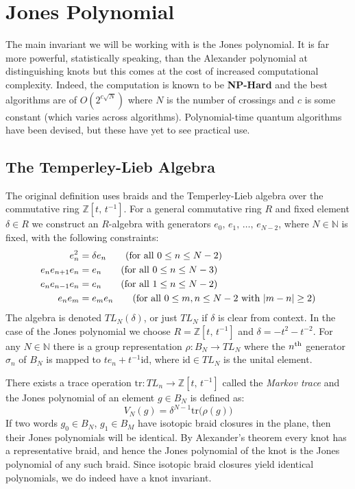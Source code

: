 \section{Jones Polynomial}
    The main invariant we will be working with is the Jones polynomial. It is
    far more powerful, statistically speaking, than the Alexander polynomial
    at distinguishing knots but this comes at the cost of increased
    computational complexity. Indeed, the computation is known to be
    \textbf{NP-Hard} and the best algorithms are of $O(2^{c\sqrt{N}})$ where
    $N$ is the number of crossings and $c$ is some constant (which varies
    across algorithms). Polynomial-time quantum algorithms have been devised,
    but these have yet to see practical use.
    \subsection{The Temperley-Lieb Algebra}
        The original definition uses braids and the Temperley-Lieb algebra
        over the commutative ring $\mathbb{Z}[t,\,t^{-1}]$. For a general
        commutative ring $R$ and fixed element $\delta\in{R}$ we construct
        an $R$-algebra with generators $e_{0},\,e_{1},\,\dots,\,e_{N-2}$,
        where $N\in\mathbb{N}$ is fixed, with the following constraints:
        \begin{align}
            e_{n}^{2}&=\delta{e}_{n}
            \tag{for all $0\leq{n}\leq{N-2}$}\\
            e_{n}e_{n+1}e_{n}&=e_{n}
            \tag{for all $0\leq{n}\leq{N-3}$}\\
            e_{n}e_{n-1}e_{n}&=e_{n}
            \tag{for all $1\leq{n}\leq{N-2}$}\\
            e_{n}e_{m}&=e_{m}e_{n}
            \tag{for all $0\leq{m,n}\leq{N-2}$ with $|m-n|\geq{2}$}
        \end{align}
        The algebra is denoted $TL_{N}(\delta)$, or just $TL_{N}$ if $\delta$
        is clear from context. In the case of the Jones polynomial we choose
        $R=\mathbb{Z}[t,\,t^{-1}]$ and $\delta=-t^{2}-t^{-2}$. For any
        $N\in\mathbb{N}$ there is a group representation
        $\rho:B_{N}\rightarrow{TL}_{N}$ where the $n^{\small\textrm{th}}$
        generator $\sigma_{n}$ of $B_{N}$ is mapped to
        $te_{n}+t^{-1}\textrm{id}$, where $\textrm{id}\in{TL}_{N}$ is the
        unital element.
        \par\hfill\par
        There exists a trace operation
        $\textrm{tr}:TL_{n}\rightarrow\mathbb{Z}[t,\,t^{-1}]$ called the
        \textit{Markov trace} and the Jones polynomial of an element
        $g\in{B}_{N}$ is defined as:
        \begin{equation}
            V_{N}(g)=\delta^{N-1}\textrm{tr}\big(\rho(g)\big)
        \end{equation}
        If two words $g_{0}\in{B}_{N}$, $g_{1}\in{B}_{M}$ have isotopic
        braid closures in the plane, then their Jones polynomials will be
        identical. By Alexander's theorem every knot has a
        representative braid, and hence the Jones polynomial of the knot is
        the Jones polynomial of any such braid. Since isotopic braid closures
        yield identical polynomials, we do indeed have a knot invariant.
